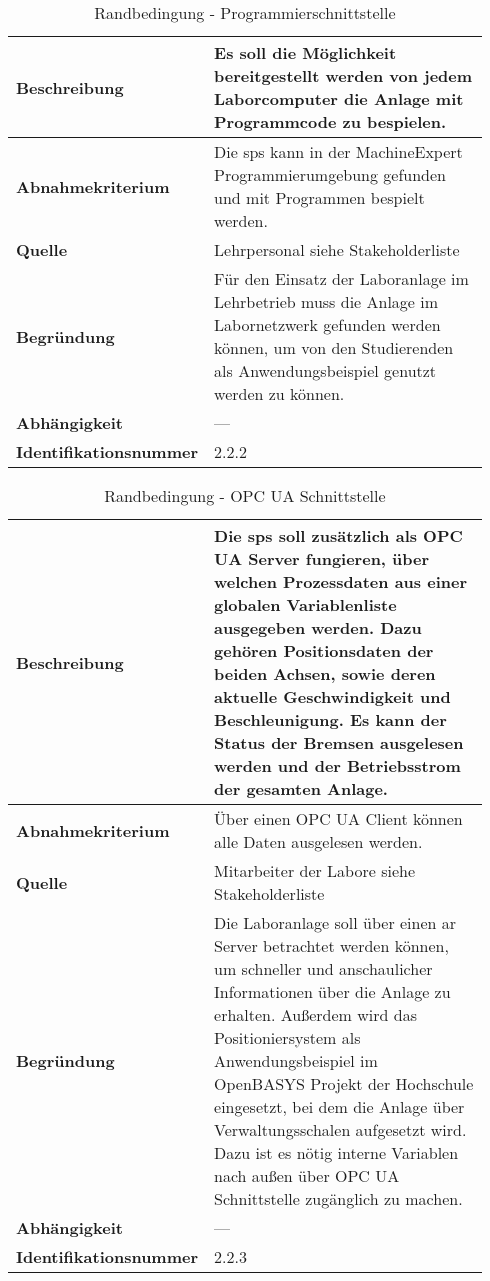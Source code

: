 \documentclass[../../../Bachelorarbeit.tex]{subfiles}
\begin{document}
\begin{table}[H]
    \centering
    \begin{tabular}{| p{0.34\linewidth} | p{0.6\linewidth} |}
        \hline
        \textbf{Beschreibung} & Es soll die Möglichkeit bereitgestellt werden von jedem Laborcomputer die Anlage mit Programmcode zu bespielen. \\ \hline
        \textbf{Abnahmekriterium} & Die \acs{sps} kann in der MachineExpert Programmierumgebung gefunden und mit Programmen bespielt werden. \\ \hline
        \textbf{Quelle} & Lehrpersonal siehe Stakeholderliste \\ \hline
        \textbf{Begründung} & Für den Einsatz der Laboranlage im Lehrbetrieb muss die Anlage im Labornetzwerk gefunden werden können, um von den Studierenden als Anwendungsbeispiel genutzt werden zu können. \\ \hline
        \textbf{Abhängigkeit} & -\xspace -\xspace - \\ \hline
        \textbf{Identifikationsnummer} & 2.2.2 \\ \hline
    \end{tabular}
    \caption[\acs{nfa} - Programmierschnittstelle]{Randbedingung - Programmierschnittstelle}
    \label{tab:my-table22}
\end{table}

\begin{table}[H]
    \centering
    \begin{tabular}{| p{0.34\linewidth} | p{0.6\linewidth} |}
        \hline
        \textbf{Beschreibung} & Die \acs{sps} soll zusätzlich als OPC UA Server fungieren, über welchen Prozessdaten aus einer globalen Variablenliste ausgegeben werden. Dazu gehören Positionsdaten der beiden Achsen, sowie deren aktuelle Geschwindigkeit und Beschleunigung. Es kann der Status der Bremsen ausgelesen werden und der Betriebsstrom der gesamten Anlage. \\ \hline
        \textbf{Abnahmekriterium} & Über einen OPC UA Client können alle Daten ausgelesen werden. \\ \hline
        \textbf{Quelle} & Mitarbeiter der Labore siehe Stakeholderliste \\ \hline
        \textbf{Begründung} & Die Laboranlage soll über einen \acs{ar} Server betrachtet werden können, um schneller und anschaulicher Informationen über die Anlage zu erhalten. Außerdem wird das Positioniersystem als Anwendungsbeispiel im OpenBASYS Projekt der Hochschule eingesetzt, bei dem die Anlage über Verwaltungsschalen aufgesetzt wird. Dazu ist es nötig interne Variablen nach außen über OPC UA Schnittstelle zugänglich zu machen. \\ \hline
        \textbf{Abhängigkeit} & -\xspace -\xspace - \\ \hline
        \textbf{Identifikationsnummer} & 2.2.3 \\ \hline
    \end{tabular}
    \caption[\acs{nfa} - OPC UA Schnittstelle]{Randbedingung - OPC UA Schnittstelle}
    \label{tab:my-table23}
\end{table}
\end{document}
